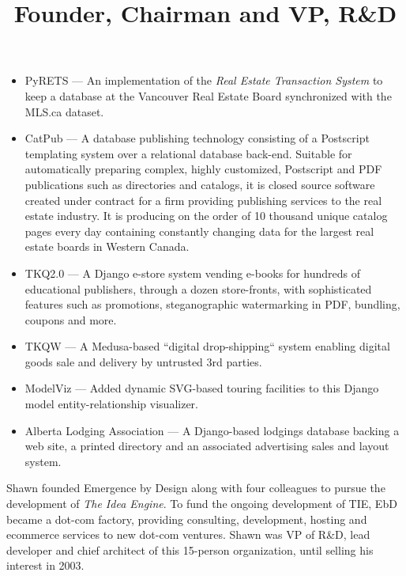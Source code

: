 \begin{resume}
\begin{position}
\begin{itemize}
  \item PyRETS --- An implementation of the \emph{Real Estate Transaction System}
  to keep a database at the Vancouver Real Estate Board synchronized with 
  the MLS.ca dataset.

  \item CatPub --- A database publishing technology consisting of a
  Postscript templating system over a relational database back-end.
  Suitable for automatically preparing complex, highly customized,
  Postscript and PDF publications such as directories and catalogs,
  it is closed source software created under contract for a firm
  providing publishing services to the real estate industry.  
  It is producing on the order of 10 thousand unique catalog pages 
  every day containing constantly changing data for the largest 
  real estate boards in Western Canada.

  \item TKQ2.0 --- A Django e-store system vending e-books for hundreds
  of educational publishers, through a dozen store-fronts, with sophisticated 
  features such as promotions, steganographic watermarking in PDF, bundling,
  coupons and more.

  \item TKQW --- A Medusa-based ``digital drop-shipping`` system
  enabling digital goods sale and delivery by untrusted 3rd parties.

  \item ModelViz --- Added dynamic SVG-based touring facilities to this Django
  model entity-relationship visualizer.

  \item Alberta Lodging Association --- A Django-based lodgings database 
  backing a web site, a printed directory and an associated advertising 
  sales and layout system.

\end{itemize}

\end{position}




\title{ Founder, Chairman and VP, R\&D }

\begin{position}
  Shawn founded Emergence by Design along with four colleagues to pursue
  the development of \emph{The Idea Engine}.  To fund the ongoing development of
  TIE, EbD became a dot-com factory, providing consulting,
  development, hosting and ecommerce services to new dot-com ventures.
  Shawn was VP of R\&D, lead developer and chief architect of this 15-person
  organization, until selling his interest in 2003.


\end{position}
\end{resume}

